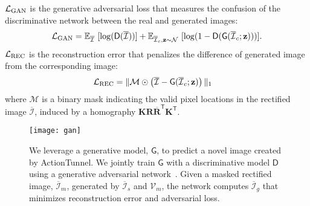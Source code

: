 \documentclass[10pt,twocolumn,letterpaper]{article}
\begin{document}
$\mathcal{L}_{\rm GAN}$ is the generative adversarial loss that measures the confusion of the discriminative network between the real and generated images: 
\begin{align}
    \mathcal{L}_{\rm GAN} = \mathbb{E}_{\overline{\mathcal{I}}}~[\log(\mathsf{D}(\overline{\mathcal{I}}))] +  \mathbb{E}_{\overline{\mathcal{I}}_c, \mathbf{z}\sim\mathcal{N}}~[\log(1-\mathsf{D}(\mathsf{G}(\overline{\mathcal{I}}_c; \mathbf{z})))]. \nonumber
\end{align}
$\mathcal{L}_{\rm REC}$ is the reconstruction error that penalizes the difference of generated image from the corresponding image:
\begin{align}
    \mathcal{L}_{\rm REC} &= \|\mathcal{M}\odot\left(\overline{\mathcal{I}}-\mathsf{G}(\overline{\mathcal{I}}_c;\mathbf{z})\right)\|_1 \nonumber
\end{align}
where $\mathcal{M}$ is a binary mask indicating the valid pixel locations in the rectified image $\overline{\mathcal{I}}$, induced by a homography $\mathbf{K}\mathbf{R}\overline{\mathbf{R}}^{\mathsf{T}}\mathbf{K}^{\mathsf{T}}$.

\begin{figure*}[th]
  \centering  
  \texttt{[image: gan]}
  \caption{We leverage a generative model, $\mathsf{G}$, to predict a novel image created by ActionTunnel. We jointly train $\mathsf{G}$ with a discriminative model $\mathsf{D}$ using a generative adversarial network~\cite{goodfellow:2014}. Given a masked rectified image, $\overline{\mathcal{I}}_m$, generated by $\overline{\mathcal{I}}_s$ and $\mathcal{V}_m$, the network computes $\overline{\mathcal{I}}_g$ that minimizes reconstruction error and adversarial loss.} \label{Fig:gan}
\end{figure*}


\end{document}
